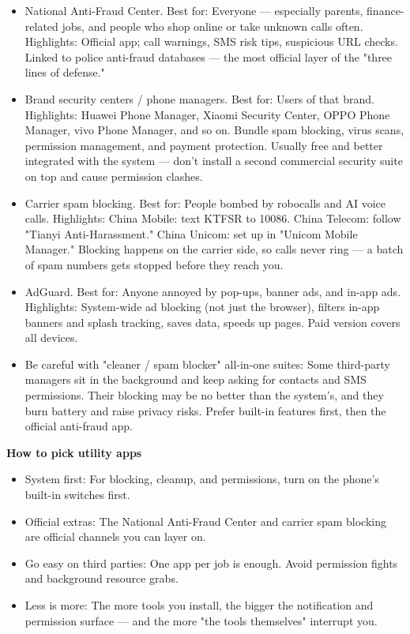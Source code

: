 \begin{itemize}
  \item National Anti-Fraud Center. Best for: Everyone — especially parents, finance-related jobs, and people who shop online or take unknown calls often. Highlights: Official app; call warnings, SMS risk tips, suspicious URL checks. Linked to police anti-fraud databases — the most official layer of the "three lines of defense."
  \item Brand security centers / phone managers. Best for: Users of that brand. Highlights: Huawei Phone Manager, Xiaomi Security Center, OPPO Phone Manager, vivo Phone Manager, and so on. Bundle spam blocking, virus scans, permission management, and payment protection. Usually free and better integrated with the system — don't install a second commercial security suite on top and cause permission clashes.
  \item Carrier spam blocking. Best for: People bombed by robocalls and AI voice calls. Highlights: China Mobile: text KTFSR to 10086. China Telecom: follow "Tianyi Anti-Harassment." China Unicom: set up in "Unicom Mobile Manager." Blocking happens on the carrier side, so calls never ring — a batch of spam numbers gets stopped before they reach you.
  \item AdGuard. Best for: Anyone annoyed by pop-ups, banner ads, and in-app ads. Highlights: System-wide ad blocking (not just the browser), filters in-app banners and splash tracking, saves data, speeds up pages. Paid version covers all devices.
  \item Be careful with "cleaner / spam blocker" all-in-one suites: Some third-party managers sit in the background and keep asking for contacts and SMS permissions. Their blocking may be no better than the system's, and they burn battery and raise privacy risks. Prefer built-in features first, then the official anti-fraud app.
\end{itemize}

\textbf{How to pick utility apps}\par

\begin{itemize}
  \item System first: For blocking, cleanup, and permissions, turn on the phone's built-in switches first.
  \item Official extras: The National Anti-Fraud Center and carrier spam blocking are official channels you can layer on.
  \item Go easy on third parties: One app per job is enough. Avoid permission fights and background resource grabs.
  \item Less is more: The more tools you install, the bigger the notification and permission surface — and the more "the tools themselves" interrupt you.
\end{itemize}

